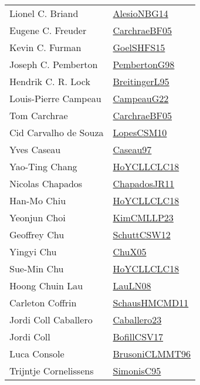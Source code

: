 {\begin{longtable}{p{4cm}p{20cm}}
Lionel C. Briand & \href{papers/AlesioNBG14.pdf}{AlesioNBG14}\cite{AlesioNBG14} \\
Eugene C. Freuder & \href{papers/CarchraeBF05.pdf}{CarchraeBF05}\cite{CarchraeBF05} \\
Kevin C. Furman & \href{articles/GoelSHFS15.pdf}{GoelSHFS15}\cite{GoelSHFS15} \\
Joseph C. Pemberton & \href{papers/PembertonG98.pdf}{PembertonG98}\cite{PembertonG98} \\
Hendrik C. R. Lock & \href{}{BreitingerL95}\cite{BreitingerL95} \\
Louis{-}Pierre Campeau & \href{articles/CampeauG22.pdf}{CampeauG22}\cite{CampeauG22} \\
Tom Carchrae & \href{papers/CarchraeBF05.pdf}{CarchraeBF05}\cite{CarchraeBF05} \\
Cid Carvalho de Souza & \href{articles/LopesCSM10.pdf}{LopesCSM10}\cite{LopesCSM10} \\
Yves Caseau & \href{papers/Caseau97.pdf}{Caseau97}\cite{Caseau97} \\
Yao{-}Ting Chang & \href{papers/HoYCLLCLC18.pdf}{HoYCLLCLC18}\cite{HoYCLLCLC18} \\
Nicolas Chapados & \href{papers/ChapadosJR11.pdf}{ChapadosJR11}\cite{ChapadosJR11} \\
Han{-}Mo Chiu & \href{papers/HoYCLLCLC18.pdf}{HoYCLLCLC18}\cite{HoYCLLCLC18} \\
Yeonjun Choi & \href{papers/KimCMLLP23.pdf}{KimCMLLP23}\cite{KimCMLLP23} \\
Geoffrey Chu & \href{papers/SchuttCSW12.pdf}{SchuttCSW12}\cite{SchuttCSW12} \\
Yingyi Chu & \href{papers/ChuX05.pdf}{ChuX05}\cite{ChuX05} \\
Sue{-}Min Chu & \href{papers/HoYCLLCLC18.pdf}{HoYCLLCLC18}\cite{HoYCLLCLC18} \\
Hoong Chuin Lau & \href{papers/LauLN08.pdf}{LauLN08}\cite{LauLN08} \\
Carleton Coffrin & \href{articles/SchausHMCMD11.pdf}{SchausHMCMD11}\cite{SchausHMCMD11} \\
Jordi Coll Caballero & \href{articles/Caballero23.pdf}{Caballero23}\cite{Caballero23} \\
Jordi Coll & \href{papers/BofillCSV17.pdf}{BofillCSV17}\cite{BofillCSV17} \\
Luca Console & \href{papers/BrusoniCLMMT96.pdf}{BrusoniCLMMT96}\cite{BrusoniCLMMT96} \\
Trijntje Cornelissens & \href{papers/SimonisC95.pdf}{SimonisC95}\cite{SimonisC95} \\

\end{longtable}}
